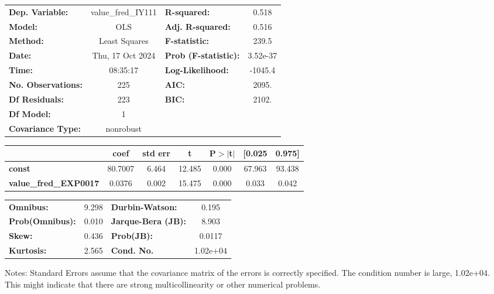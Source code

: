 \begin{center}
\begin{tabular}{lclc}
\toprule
\textbf{Dep. Variable:}       & value\_fred\_IY111 & \textbf{  R-squared:         } &     0.518   \\
\textbf{Model:}               &        OLS         & \textbf{  Adj. R-squared:    } &     0.516   \\
\textbf{Method:}              &   Least Squares    & \textbf{  F-statistic:       } &     239.5   \\
\textbf{Date:}                &  Thu, 17 Oct 2024  & \textbf{  Prob (F-statistic):} &  3.52e-37   \\
\textbf{Time:}                &      08:35:17      & \textbf{  Log-Likelihood:    } &   -1045.4   \\
\textbf{No. Observations:}    &          225       & \textbf{  AIC:               } &     2095.   \\
\textbf{Df Residuals:}        &          223       & \textbf{  BIC:               } &     2102.   \\
\textbf{Df Model:}            &            1       & \textbf{                     } &             \\
\textbf{Covariance Type:}     &     nonrobust      & \textbf{                     } &             \\
\bottomrule
\end{tabular}
\begin{tabular}{lcccccc}
                              & \textbf{coef} & \textbf{std err} & \textbf{t} & \textbf{P$> |$t$|$} & \textbf{[0.025} & \textbf{0.975]}  \\
\midrule
\textbf{const}                &      80.7007  &        6.464     &    12.485  &         0.000        &       67.963    &       93.438     \\
\textbf{value\_fred\_EXP0017} &       0.0376  &        0.002     &    15.475  &         0.000        &        0.033    &        0.042     \\
\bottomrule
\end{tabular}
\begin{tabular}{lclc}
\textbf{Omnibus:}       &  9.298 & \textbf{  Durbin-Watson:     } &    0.195  \\
\textbf{Prob(Omnibus):} &  0.010 & \textbf{  Jarque-Bera (JB):  } &    8.903  \\
\textbf{Skew:}          &  0.436 & \textbf{  Prob(JB):          } &   0.0117  \\
\textbf{Kurtosis:}      &  2.565 & \textbf{  Cond. No.          } & 1.02e+04  \\
\bottomrule
\end{tabular}
\end{center}

Notes: \newline
 [1] Standard Errors assume that the covariance matrix of the errors is correctly specified. \newline
 [2] The condition number is large, 1.02e+04. This might indicate that there are \newline
 strong multicollinearity or other numerical problems.